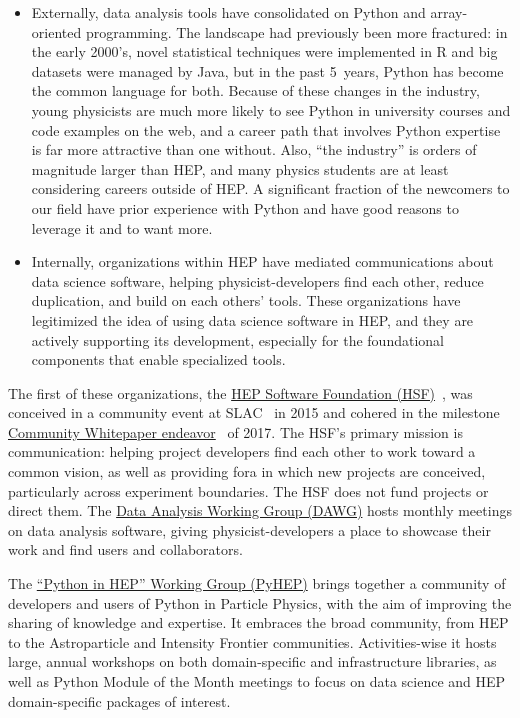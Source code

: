 \documentclass[12pt,a4paper]{article}
\begin{document}
\begin{itemize}
\item Externally, data analysis tools have consolidated on Python and array-oriented programming. The landscape had previously been more fractured: in the early 2000's, novel statistical techniques were implemented in R and big datasets were managed by Java, but in the past 5~years, Python has become the common language for both. Because of these changes in the industry, young physicists are much more likely to see Python in university courses and code examples on the web, and a career path that involves Python expertise is far more attractive than one without. Also, ``the industry'' is orders of magnitude larger than HEP, and many physics students are at least considering careers outside of HEP. A significant fraction of the newcomers to our field have prior experience with Python and have good reasons to leverage it and to want more.

\item Internally, organizations within HEP have mediated communications about data science software, helping physicist-developers find each other, reduce duplication, and build on each others' tools. These organizations have legitimized the idea of using data science software in HEP, and they are actively supporting its development, especially for the foundational components that enable specialized tools.
\end{itemize}

The first of these organizations, the \href{https://hepsoftwarefoundation.org/}{HEP Software Foundation (HSF)}~\cite{HSF}, was conceived in a community event at SLAC~\cite{hsf-workshop-slac2015} in 2015 and cohered in the milestone \href{https://hepsoftwarefoundation.org/organization/cwp.html}{Community Whitepaper endeavor}~\cite{Albrecht2019} of 2017. The HSF's primary mission is communication: helping project developers find each other to work toward a common vision, as well as providing fora in which new projects are conceived, particularly across experiment boundaries. The HSF does not fund projects or direct them. The \href{https://hepsoftwarefoundation.org/workinggroups/dataanalysis.html}{Data Analysis Working Group (DAWG)} hosts monthly meetings on data analysis software, giving physicist-developers a place to showcase their work and find users and collaborators.

The \href{https://hepsoftwarefoundation.org/workinggroups/pyhep.html}{``Python in HEP'' Working Group (PyHEP)} brings together a community of developers and users of Python in Particle Physics, with the aim of improving the sharing of knowledge and expertise. It embraces the broad community, from HEP to the Astroparticle and Intensity Frontier communities. Activities-wise it hosts large, annual workshops on both domain-specific and infrastructure libraries, as well as Python Module of the Month meetings to focus on data science and HEP domain-specific packages of interest.
\end{document}
